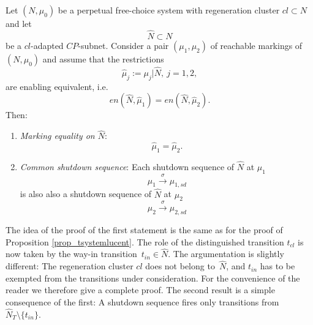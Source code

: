 \documentclass{fundam}
\begin{document}
\begin{proposition}\label{prop_markingequality}
Let $(N,\mu_0)$ be a perpetual free-choice system with regeneration cluster $cl \subset N$ and let
$$\hat{N} \subset N$$
be a $cl$-adapted $CP$-subnet. Consider a pair $(\mu_1,\mu_2)$ of reachable markings \mbox{of $(N,\mu_0)$} and assume that the restrictions
$$\hat{\mu}_j:=\mu_j|\hat{N},\ j=1,2,$$
are enabling equivalent, i.e.
$$en(\hat{N},\hat{\mu}_1) = en(\hat{N},\hat{\mu}_2).$$
Then:
\begin{enumerate}
\item \emph{Marking equality on $\hat{N}$}:
$$\hat{\mu}_1=\hat{\mu}_2.$$
\item \emph{Common shutdown sequence}:  Each shutdown sequence of $\hat{N}$ at $\mu_1$
$$\mu_1 \xrightarrow{\sigma} \mu_{1,sd}$$
is also also a shutdown sequence of $\hat{N}$ at $\mu_2$
$$\mu_2 \xrightarrow{\sigma} \mu_{2,sd}$$
\end{enumerate}
\end{proposition}
The idea of the proof of the first statement is the same as for the proof of Proposition \ref{prop_tsystemlucent}. The role of the distinguished transition $t_{cl}$ is now taken by the way-in \mbox{transition $t_{in} \in \hat{N}$}. The argumentation is slightly different: The regeneration cluster $cl$ does not belong \mbox{to $\hat{N}$}, and $t_{in}$ has to be exempted from the transitions under consideration. For the convenience of the reader we therefore give a complete proof. The second result is a simple consequence of the first: A shutdown sequence fires only transitions from $\hat{N}_T\setminus \{t_{in}\}$.
\end{document}
